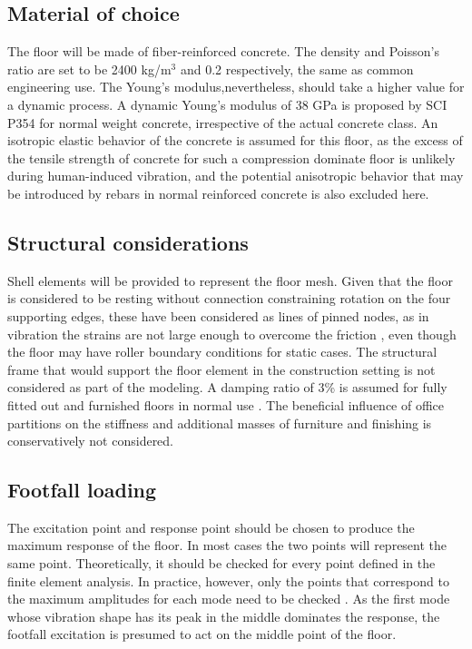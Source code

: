 \subsection{Material of choice}
The floor will be made of fiber-reinforced concrete. The density and Poisson's ratio are set to be 2400 kg/m$^3$ and 0.2 respectively, the same as common engineering use. The Young's modulus,nevertheless, should take a higher value for a dynamic process. A dynamic Young's modulus of 38 GPa is proposed by SCI P354 for normal weight concrete, irrespective of the actual concrete class. An isotropic elastic behavior of the concrete is assumed for this floor, as the excess of the tensile strength of concrete for such a compression dominate floor is unlikely during human-induced vibration, and the potential anisotropic behavior that may be introduced by rebars in normal reinforced concrete is also excluded here.

\subsection{Structural considerations}
Shell elements will be provided to represent the floor mesh. Given that the floor is considered to be resting without connection constraining rotation on the four supporting edges, these have been considered as lines of pinned nodes, as in vibration the strains are not large enough to overcome the friction \cite{smith2007design}, even though the floor may have roller boundary conditions for static cases. The structural frame that would support the floor element in the construction setting is not considered as part of the modeling. A damping ratio of 3\% is assumed for fully fitted out and furnished floors in normal use \cite{smith2007design}. The beneficial influence of office partitions on the stiffness and additional masses of furniture and finishing is conservatively not considered.

\subsection{Footfall loading}
The excitation point and response point should be chosen to produce the maximum response of the floor. In most cases the two points will represent the same point. Theoretically, it should be checked for every point defined in the finite element analysis. In practice, however, only the points that correspond to the maximum amplitudes for each mode need to be checked \cite{smith2007design}. As the first mode whose vibration shape has its peak in the middle dominates the response, the footfall excitation is presumed to act on the middle point of the floor. 

